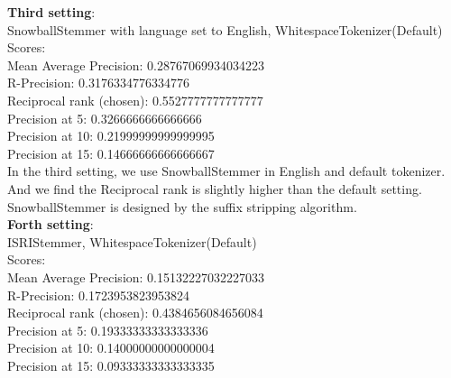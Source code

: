 \documentclass{article}
\begin{document}



\noindent
\textbf{Third setting}:\\
SnowballStemmer with language set to English, WhitespaceTokenizer(Default)\\
Scores:\\
Mean Average Precision: 0.28767069934034223\\
R-Precision: 0.3176334776334776\\
Reciprocal rank (chosen): 0.5527777777777777\\
Precision at 5: 0.3266666666666666\\
Precision at 10: 0.21999999999999995\\
Precision at 15: 0.14666666666666667\\

In the third setting, we use SnowballStemmer in English and default tokenizer. 
And we find the Reciprocal rank is slightly higher than the default setting. 
SnowballStemmer is designed by the suffix stripping algorithm.\\

\noindent
\textbf{Forth setting}:\\
ISRIStemmer, WhitespaceTokenizer(Default)\\
Scores:\\
Mean Average Precision: 0.15132227032227033\\
R-Precision: 0.1723953823953824\\
Reciprocal rank (chosen): 0.4384656084656084\\
Precision at 5: 0.19333333333333336\\
Precision at 10: 0.14000000000000004\\
Precision at 15: 0.09333333333333335\\
\end{document}
